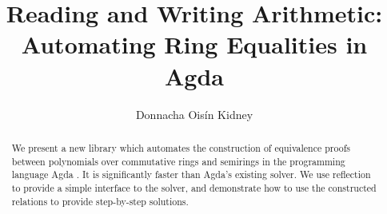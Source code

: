 \documentclass[acmsmall,review,anonymous]{acmart}\settopmatter{printfolios=true,printccs=false,printacmref=false}
\theoremstyle{remark}
\begin{document}
\title[Reading and Writing Arithmetic]{Reading and Writing Arithmetic: Automating Ring Equalities
  in Agda}


\author{Donnacha Oisín Kidney}
\begin{abstract}
  We present a new library which automates the construction of equivalence
  proofs between polynomials over commutative rings and semirings in the
  programming language Agda \cite{norell_dependently_2008}. It is significantly
  faster than Agda's existing solver. We use reflection to provide a simple
  interface to the solver, and demonstrate how to use the constructed relations
  to provide step-by-step solutions.
\end{abstract}


\end{document}
